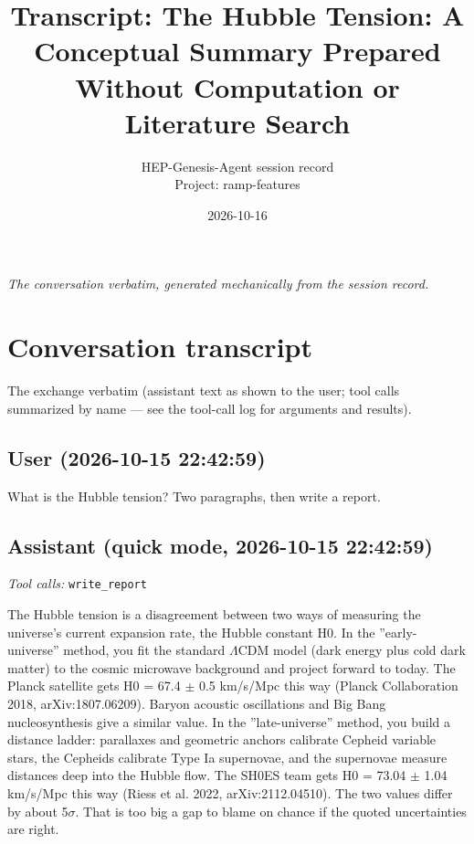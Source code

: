 \documentclass[11pt,a4paper]{article}
\title{Transcript: The Hubble Tension: A Conceptual Summary Prepared Without Computation or Literature Search}
\author{HEP-Genesis-Agent session record \\ \small Project: ramp-features}
\date{2026-10-16}
\begin{document}
\maketitle
\noindent\textit{\small The conversation verbatim, generated mechanically from the session record.}
\vspace{1em}



\appendix
\section{Conversation transcript}
\label{app:transcript}
The exchange verbatim (assistant text as shown to the user; tool calls summarized by name --- see the tool-call log for arguments and results).
\subsection*{User \small(2026-10-15 22:42:59)}
What is the Hubble tension? Two paragraphs, then write a report.

\subsection*{Assistant \small(quick mode, 2026-10-15 22:42:59)}
\textit{Tool calls:} \texttt{write\_report}\par
The Hubble tension is a disagreement between two ways of measuring the universe's current expansion rate, the Hubble constant H0. In the ''early-universe'' method, you fit the standard $\Lambda$CDM model (dark energy plus cold dark matter) to the cosmic microwave background and project forward to today. The Planck satellite gets H0 = 67.4 $\pm$ 0.5 km/s/Mpc this way (Planck Collaboration 2018, arXiv:1807.06209). Baryon acoustic oscillations and Big Bang nucleosynthesis give a similar value. In the ''late-universe'' method, you build a distance ladder: parallaxes and geometric anchors calibrate Cepheid variable stars, the Cepheids calibrate Type Ia supernovae, and the supernovae measure distances deep into the Hubble flow. The SH0ES team gets H0 = 73.04 $\pm$ 1.04 km/s/Mpc this way (Riess et al. 2022, arXiv:2112.04510). The two values differ by about 5$\sigma$. That is too big a gap to blame on chance if the quoted uncertainties are right.
\end{document}
